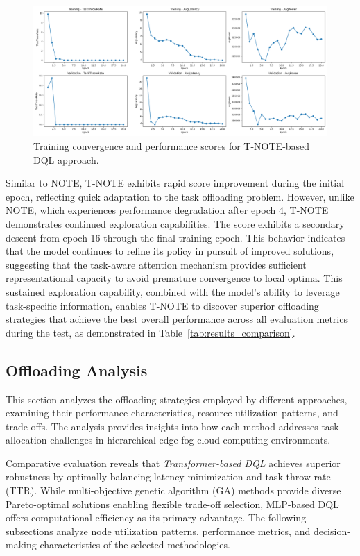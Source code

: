\documentclass[preprint,3p,authoryear]{elsarticle}
\begin{document}
\begin{figure}[H]
    \centering
    \includegraphics[width=1\linewidth]{figs/T-NOTE/score_plot.png}
    \caption{Training convergence and performance scores for T-NOTE-based DQL approach.}
    \label{fig:T-NOTE-score-plot}
\end{figure}

Similar to NOTE, T-NOTE exhibits rapid score improvement during the initial epoch, reflecting quick adaptation to the task offloading problem. However, unlike NOTE, which experiences performance degradation after epoch 4, T-NOTE demonstrates continued exploration capabilities. The score exhibits a secondary descent from epoch 16 through the final training epoch. This behavior indicates that the model continues to refine its policy in pursuit of improved solutions, suggesting that the task-aware attention mechanism provides sufficient representational capacity to avoid premature convergence to local optima. This sustained exploration capability, combined with the model's ability to leverage task-specific information, enables T-NOTE to discover superior offloading strategies that achieve the best overall performance across all evaluation metrics during the test, as demonstrated in Table~\ref{tab:results_comparison}.


\subsection{Offloading Analysis}\label{subsec:offloading-analysis}

This section analyzes the offloading strategies employed by different approaches, examining their performance characteristics, resource utilization patterns, and trade-offs. The analysis provides insights into how each method addresses task allocation challenges in hierarchical edge-fog-cloud computing environments.

Comparative evaluation reveals that \emph{Transformer-based DQL} achieves superior robustness by optimally balancing latency minimization and task throw rate (TTR). While multi-objective genetic algorithm (GA) methods provide diverse Pareto-optimal solutions enabling flexible trade-off selection, MLP-based DQL offers computational efficiency as its primary advantage. The following subsections analyze node utilization patterns, performance metrics, and decision-making characteristics of the selected methodologies.
\end{document}

